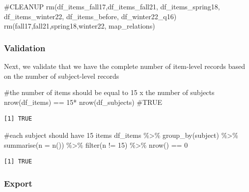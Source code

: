 \documentclass[
  letterpaper,
  DIV=11,
  numbers=noendperiod]{scrreprt}
\newenvironment{Shaded}{\begin{snugshade}}{\end{snugshade}}
\newcommand{\AttributeTok}[1]{\textcolor[rgb]{0.40,0.45,0.13}{#1}}
\newcommand{\CommentTok}[1]{\textcolor[rgb]{0.37,0.37,0.37}{#1}}
\newcommand{\DecValTok}[1]{\textcolor[rgb]{0.68,0.00,0.00}{#1}}
\newcommand{\FunctionTok}[1]{\textcolor[rgb]{0.28,0.35,0.67}{#1}}
\newcommand{\NormalTok}[1]{\textcolor[rgb]{0.00,0.23,0.31}{#1}}
\newcommand{\SpecialCharTok}[1]{\textcolor[rgb]{0.37,0.37,0.37}{#1}}
\begin{document}
\begin{Shaded}
\begin{Highlighting}[]
\CommentTok{\#CLEANUP}
\FunctionTok{rm}\NormalTok{(df\_items\_fall17,df\_items\_fall21, df\_items\_spring18, df\_items\_winter22, df\_items\_before, df\_winter22\_q16)}
\FunctionTok{rm}\NormalTok{(fall17,fall21,spring18,winter22, map\_relations)}
\end{Highlighting}
\end{Shaded}

\hypertarget{validation}{%
\subsubsection{Validation}\label{validation}}

Next, we validate that we have the complete number of item-level records
based on the number of subject-level records

\begin{Shaded}
\begin{Highlighting}[]
\CommentTok{\#the number of items should be equal to 15 x the number of subjects}
\FunctionTok{nrow}\NormalTok{(df\_items) }\SpecialCharTok{==} \DecValTok{15}\SpecialCharTok{*} \FunctionTok{nrow}\NormalTok{(df\_subjects) }\CommentTok{\#TRUE}
\end{Highlighting}
\end{Shaded}

\begin{verbatim}
[1] TRUE
\end{verbatim}

\begin{Shaded}
\begin{Highlighting}[]
\CommentTok{\#each subject should have 15 items}
\NormalTok{df\_items }\SpecialCharTok{\%\textgreater{}\%} \FunctionTok{group\_by}\NormalTok{(subject) }\SpecialCharTok{\%\textgreater{}\%} \FunctionTok{summarise}\NormalTok{(}\AttributeTok{n =} \FunctionTok{n}\NormalTok{()) }\SpecialCharTok{\%\textgreater{}\%} \FunctionTok{filter}\NormalTok{(n }\SpecialCharTok{!=} \DecValTok{15}\NormalTok{) }\SpecialCharTok{\%\textgreater{}\%} \FunctionTok{nrow}\NormalTok{() }\SpecialCharTok{==} \DecValTok{0}
\end{Highlighting}
\end{Shaded}

\begin{verbatim}
[1] TRUE
\end{verbatim}

\hypertarget{export}{%
\subsubsection{Export}\label{export}}
\end{document}
